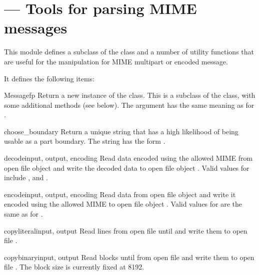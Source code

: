 \section{ ---
         Tools for parsing MIME messages}



This module defines a subclass of the  class and
a number of utility functions that are useful for the manipulation for
MIME multipart or encoded message.

It defines the following items:

\begin{classdesc}{Message}{fp}
Return a new instance of the  class.  This is a
subclass of the  class, with some additional
methods (see below).  The  argument has the same meaning
as for .
\end{classdesc}

\begin{funcdesc}{choose_boundary}{}
Return a unique string that has a high likelihood of being usable as a
part boundary.  The string has the form
.
\end{funcdesc}

\begin{funcdesc}{decode}{input, output, encoding}
Read data encoded using the allowed MIME  from open file
object  and write the decoded data to open file object
.  Valid values for  include
,  and .
\end{funcdesc}

\begin{funcdesc}{encode}{input, output, encoding}
Read data from open file object  and write it encoded using
the allowed MIME  to open file object .
Valid values for  are the same as for .
\end{funcdesc}

\begin{funcdesc}{copyliteral}{input, output}
Read lines from open file  until \EOF{} and write them to
open file .
\end{funcdesc}

\begin{funcdesc}{copybinary}{input, output}
Read blocks until \EOF{} from open file  and write them to
open file .  The block size is currently fixed at 8192.
\end{funcdesc}


